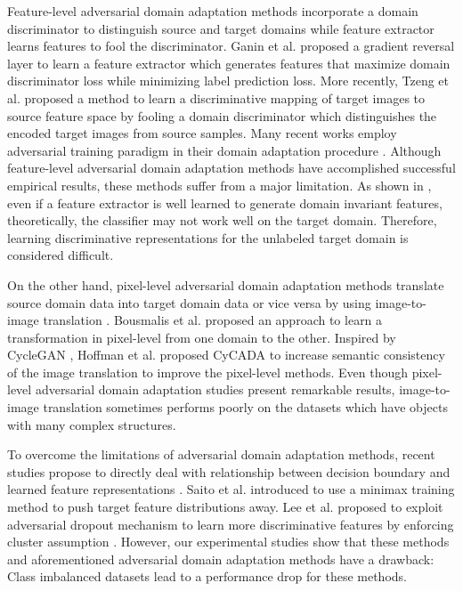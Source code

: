 \documentclass[final]{cvpr}
\begin{document}
Feature-level adversarial domain adaptation methods incorporate a domain discriminator to distinguish source and target domains while feature extractor learns features to fool the discriminator. Ganin et al. \cite{dann} proposed a gradient reversal layer to learn a feature extractor which generates features that maximize domain discriminator loss while minimizing label prediction loss. More recently, Tzeng et al. \cite{adda} proposed a method to learn a discriminative mapping of target images to source feature space by fooling a domain discriminator which distinguishes the encoded target images from source samples. Many recent works employ adversarial training paradigm in their domain adaptation procedure \cite{tat, cdan}. Although feature-level adversarial domain adaptation methods have accomplished successful empirical results, these methods suffer from a major limitation. As shown in \cite{ben2010theory}, even if a feature extractor is well learned to generate domain invariant features, theoretically, the classifier may not work well on the target domain. Therefore, learning discriminative representations for the unlabeled target domain is considered difficult. 

On the other hand, pixel-level adversarial domain adaptation methods translate source domain data into target domain data or vice versa by using image-to-image translation \cite{itoi}. Bousmalis et al. \cite{pixelda} proposed an approach to learn a transformation in pixel-level from one domain to the other. Inspired by CycleGAN \cite{cyclegan}, Hoffman et al. \cite{cycada} proposed CyCADA to increase semantic consistency of the image translation to improve the pixel-level methods. Even though pixel-level adversarial domain adaptation studies present remarkable results, image-to-image translation sometimes performs poorly on the datasets which have objects with many complex structures.

To overcome the limitations of adversarial domain adaptation methods, recent studies propose to directly deal with relationship between decision boundary and learned feature representations \cite{dta, mcdda}. Saito et al. \cite{mcdda} introduced to use a minimax training method to push target feature distributions away. Lee et al. \cite{dta} proposed to exploit adversarial dropout mechanism to learn more discriminative features by enforcing cluster assumption \cite{chapelle2005semi}. However, our experimental studies show that these methods and aforementioned adversarial domain adaptation methods have a drawback: Class imbalanced datasets \cite{buda2018systematic, classimbalance} lead to a performance drop for these methods.
\end{document}
